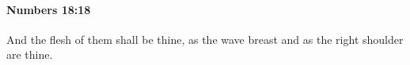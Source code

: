 
		\paragraph{Numbers 18:18} %
			\label{NUMBERS-18-18}

			And the flesh of them shall be thine, as the wave breast and as the right shoulder are thine.


